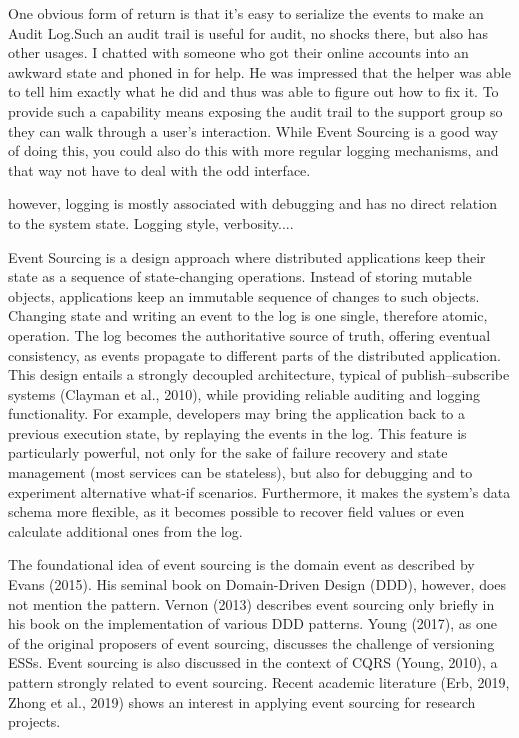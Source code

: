 One obvious form of return is that it's easy to serialize the events to make an Audit Log.Such an audit trail is useful for audit, no shocks there, but also has other usages. I chatted with someone who got their online accounts into an awkward state and phoned in for help. He was impressed that the helper was able to tell him exactly what he did and thus was able to figure out how to fix it. To provide such a capability means exposing the audit trail to the support group so they can walk through a user's interaction. While Event Sourcing is a good way of doing this, you could also do this with more regular logging mechanisms, and that way not have to deal with the odd interface. %

however, logging is mostly associated with debugging and has no direct relation to the system state. Logging style, verbosity....

Event Sourcing is a design approach where distributed applications keep their state as a sequence of state-changing operations. Instead of storing mutable objects, applications keep an immutable sequence of changes to such objects. Changing state and writing an event to the log is one single, therefore atomic, operation. The log becomes the authoritative source of truth, offering eventual consistency, as events propagate to different parts of the distributed application. This design entails a strongly decoupled architecture, typical of publish–subscribe systems (Clayman et al., 2010), while providing reliable auditing and logging functionality. For example, developers may bring the application back to a previous execution state, by replaying the events in the log. This feature is particularly powerful, not only for the sake of failure recovery and state management (most services can be stateless), but also for debugging and to experiment alternative what-if scenarios. Furthermore, it makes the system’s data schema more flexible, as it becomes possible to recover field values or even calculate additional ones from the log.

The foundational idea of event sourcing is the domain event as described by Evans (2015). His seminal book on Domain-Driven Design (DDD), however, does not mention the pattern. Vernon (2013) describes event sourcing only briefly in his book on the implementation of various DDD patterns. Young (2017), as one of the original proposers of event sourcing, discusses the challenge of versioning ESSs. Event sourcing is also discussed in the context of CQRS (Young, 2010), a pattern strongly related to event sourcing. Recent academic literature (Erb, 2019, Zhong et al., 2019) shows an interest in applying event sourcing for research projects.


